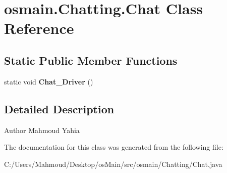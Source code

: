 \hypertarget{classosmain_1_1_chatting_1_1_chat}{}\section{osmain.\+Chatting.\+Chat Class Reference}
\label{classosmain_1_1_chatting_1_1_chat}
\subsection*{Static Public Member Functions}
\begin{DoxyCompactItemize}
\item 
static void {\bfseries Chat\+\_\+\+Driver} ()\hypertarget{classosmain_1_1_chatting_1_1_chat_abdead708b3eb0c95958bf220bc4caf95}{}\label{classosmain_1_1_chatting_1_1_chat_abdead708b3eb0c95958bf220bc4caf95}

\end{DoxyCompactItemize}


\subsection{Detailed Description}
\begin{DoxyAuthor}{Author}
Mahmoud Yahia 
\end{DoxyAuthor}


The documentation for this class was generated from the following file\+:\begin{DoxyCompactItemize}
\item 
C\+:/\+Users/\+Mahmoud/\+Desktop/os\+Main/src/osmain/\+Chatting/Chat.\+java\end{DoxyCompactItemize}
